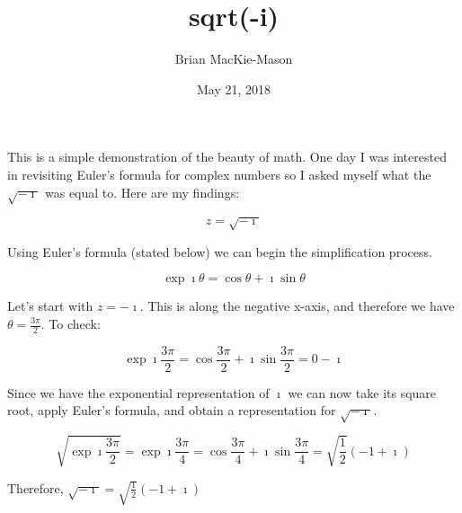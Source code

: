 \documentclass[12pt]{article}
\author{Brian MacKie-Mason}
\title{sqrt(-i)}
\date{May 21, 2018}
\begin{document}
\maketitle

This is a simple demonstration of the beauty of math. One day I was interested in revisiting Euler's formula for complex numbers so I asked myself what the $\sqrt{-\imath}$ was equal to. Here are my findings:

\begin{equation}
	z = \sqrt{-\imath}
\end{equation}

Using Euler's formula (stated below) we can begin the simplification process.

\begin{equation}
	\exp{\imath \theta} = \cos{\theta} + \imath \sin{\theta}
\end{equation}

Let's start with $z = -\imath$. This is along the negative x-axis, and therefore we have $\theta = \frac{3 \pi}{2}$. To check:

\begin{equation}
	\exp{\imath \frac{3\pi}{2}} = \cos{\frac{3\pi}{2}} + \imath \sin{\frac{3\pi}{2}} = 0 - \imath
\end{equation}

Since we have the exponential representation of $\imath$ we can now take its square root, apply Euler's formula, and obtain a representation for $\sqrt{-\imath}$.

\begin{equation}
	\sqrt{\exp{\imath \frac{3\pi}{2}}} = \exp{\imath \frac{3\pi}{4}} = \cos{\frac{3\pi}{4}} + \imath \sin{\frac{3\pi}{4}} = \sqrt{\frac{1}{2}} \left( -1 + \imath \right)
\end{equation}

Therefore, $\sqrt{-\imath} = \sqrt{\frac{1}{2}} \left( -1 + \imath \right)$
\end{document}

